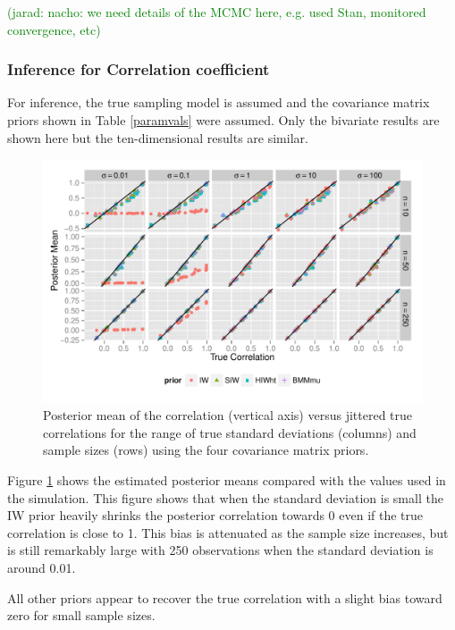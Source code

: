 \documentclass[12pt]{article}
\newcommand{\jarad}[1]{\textcolor{green}{(jarad: #1)}}
\begin{document}
\jarad{nacho: we need details of the MCMC here, e.g. used Stan, monitored convergence, etc}

\subsubsection{Inference for Correlation coefficient}

For inference, the true sampling model is assumed and the covariance matrix priors shown in Table \ref{paramvals} were assumed. Only the bivariate results are shown here but the ten-dimensional results are similar.

\begin{figure}[hbtp]
\centering
\includegraphics[width=\textwidth] {fig_rho_d2} 
\vspace{-.5in}
\caption{Posterior mean of the correlation (vertical axis) versus jittered true correlations for the range of true standard deviations (columns) and sample sizes (rows) using the four covariance matrix priors.}
\label{rhod2}
\end{figure}

Figure \ref{rhod2} shows the estimated posterior means compared with the values used in the simulation. This figure shows that when the standard deviation is small the IW prior heavily shrinks the posterior correlation towards 0 even if the true correlation is close to 1. This bias is attenuated as the sample size increases, but is still remarkably large with 250 observations when the standard deviation is around 0.01. 

All other priors appear to recover the true correlation with a slight bias toward zero for small sample sizes.
\end{document}
